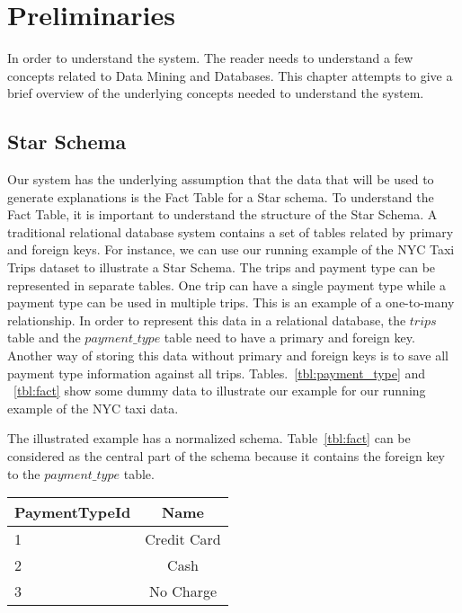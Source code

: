 \chapter{Preliminaries}
\label{chp:prelims}
In order to understand the system. The reader needs to understand a few concepts related to Data Mining and Databases. This chapter attempts to give a brief overview of the underlying concepts needed to understand the system.

\section{Star Schema}
Our system has the underlying assumption that the data that will be used to generate explanations is the Fact Table for a Star schema\citep{giovinazzo2000object,adamson2010star}. To understand the Fact Table, it is important to understand the structure of the Star Schema. A traditional relational database system contains a set of tables related by primary and foreign keys. For instance, we can use our running example of the NYC Taxi Trips dataset to illustrate a Star Schema. The trips and payment type can be represented in separate tables. One trip can have a single payment type while a payment type can be used in multiple trips. This is an example of a one-to-many relationship.
In order to represent this data in a relational database, the $trips$ table and the $payment\_type$ table need to have a primary and foreign key. Another way of storing this data without primary and foreign keys is to save all payment type information against all trips. Tables.~\ref{tbl:payment_type} and ~\ref{tbl:fact} show some dummy data to illustrate our example for our running example of the NYC taxi data.

The illustrated example has a normalized schema\citep{beeri1988sophisticate}. Table~\ref{tbl:fact} can be considered as the central part of the schema because it contains the foreign key to the $payment\_type$ table.



\begin{center}
  \begin{tabular}{ | l | c | }
    \hline
    \textbf{PaymentTypeId} & \textbf{Name} \\ \hline
    1 & Credit Card  \\ \hline
    2 & Cash  \\ \hline
    3 & No Charge  \\
    \hline
  \end{tabular}
\end{center}
\label{tbl:payment_type}

